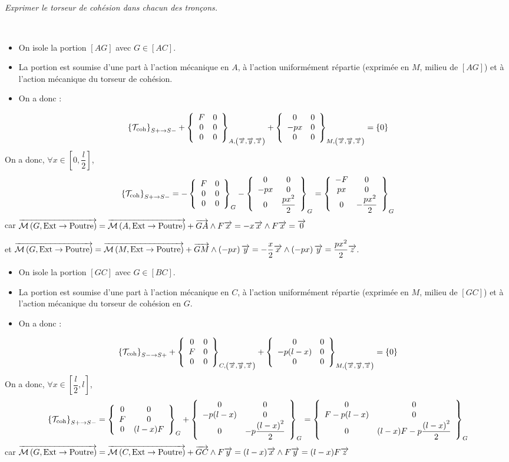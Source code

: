 \documentclass[10pt,fleqn]{article} %
\begin{document}
\begin{multicols}{1}
\subparagraph{}
\textit{Exprimer le torseur de cohésion dans chacun des tronçons.}
\ifprof
\begin{corrige}
~\\
\begin{itemize}[label=,font=\color{ocre}] 
\item On isole la portion $[AG]$ avec $G \in [AC]$.
\item La portion est soumise d'une part à l'action mécanique en $A$, à l'action uniformément répartie (exprimée en $M$, milieu de $[AG]$) et à l'action mécanique du torseur de cohésion.
\item On a donc : 
\end{itemize}
$$
\torseurscoh_{S+\rightarrow S-} +
 \torseurcol{F}{0}{0}{0}{0}{0}{A,\left( \vect{x},\vect{y},\vect{z} \right)} 
 +\torseurcol{0}{-px}{0}{0}{0}{0}{M,\left( \vect{x},\vect{y},\vect{z} \right)} 
 = \{0\}
$$
On a donc, $\forall x \in \left[0,\dfrac{l}{2}\right]$, 
$$
\torseurscoh_{S+\rightarrow S-}
=-\torseurcol{F}{0}{0}{0}{0}{0}{G}
-\torseurcol{0}{-px}{0}{0}{0}{ \dfrac{px^2}{2}}{G}
=\torseurcol{-F}{px}{0}{0}{0}{-\dfrac{px^2}{2}}{G}
$$
car 
$\vectm{G}{\text{Ext}}{\text{Poutre}}
=\vectm{A}{\text{Ext}}{\text{Poutre}} + \vect{GA}\wedge F \vect{x}  
=  -x\vect{x}  \wedge F \vect{x}
=  \vect{0}
$ 

et 
$\vectm{G}{\text{Ext}}{\text{Poutre}}
=\vectm{M}{\text{Ext}}{\text{Poutre}} + \vect{GM}\wedge \left( -px \right) \vect{y}  
= -\dfrac{x}{2}\vect{x}\wedge \left( -px\right) \vect{y}  
=   \dfrac{px^2}{2} \vect{z}  
$.

\begin{itemize}[label=,font=\color{ocre}] 
\item On isole la portion $[GC]$ avec $G\in [BC]$.
\item La portion est soumise d'une part à l'action mécanique en $C$, à l'action uniformément répartie (exprimée en $M$, milieu de $[GC]$) et à l'action mécanique du torseur de cohésion en $G$.
\item On a donc : 
\end{itemize}
$$
\torseurscoh_{S-\rightarrow S+} +
 \torseurcol{0}{F}{0}{0}{0}{0}{C,\left( \vect{x},\vect{y},\vect{z} \right)} 
 +\torseurcol{0}{-p(l-x)}{0}{0}{0}{0}{M,\left( \vect{x},\vect{y},\vect{z} \right)} 
 = \{0\}
$$
On a donc, $\forall x \in \left[\dfrac{l}{2},l\right]$, 
$$
\torseurscoh_{S+\rightarrow S-}
= \torseurcol{0}{F}{0}{0}{0}{(l-x)F}{G} 
 +\torseurcol{0}{-p(l-x)}{0}{0}{0}{-p\dfrac{\left(l-x\right)^2}{2}}{G} 
 = \torseurcol{0}{F-p(l-x)}{0}{0}{0}{(l-x)F-p\dfrac{\left(l-x\right)^2}{2}}{G} 
$$
car 
$\vectm{G}{\text{Ext}}{\text{Poutre}}
=\vectm{C}{\text{Ext}}{\text{Poutre}} + \vect{GC}\wedge F \vect{y}  
=  (l-x)\vect{x}  \wedge F \vect{y}
=  (l-x)F\vect{z}
$ 


\end{corrige}
\end{multicols}
\end{document}
